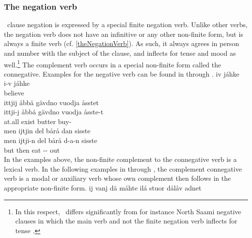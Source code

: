 \subsubsection{The negation verb}\label{negation}
\PS\ clause negation is expressed by a special finite negation verb. Unlike other verbs, the negation verb does not have an infinitive or any other non-finite form, but is always a finite verb (cf. \SEC\ref{theNegationVerb}). As such, it always agrees in person and number with the subject of the clause, and inflects for tense and mood as well.\footnote{In this respect, \PS\ differs significantly from for instance North Saami negative clauses in which the main verb and not the finite negation verb inflects for tense \citep[cf.][92]{Svonni2009}.} 
The complement verb occurs in a special non-finite form called the connegative.
Examples for the negative verb can be found in  through . 
\ea\label{negation1}%
\glll	iv jáhke\\
	i-v jáhke\\
	 believe\BS{} \\\nopagebreak
{} 
\z
\ea\label{negation2}%
\glll	ittjij åbbå gävdno vuodja åsstet\\
	ittji-j åbbå gävdno vuodja åsste-t\\
	 at.all exist\BS{} butter\BS{} buy-\\\nopagebreak
{} 
\z
\ea\label{negation3}%
\glll	men ijtjin del bårå dan sisste \\
	men ijtji-n del bårå d-a-n sisste \\
	but  then eat\BS{} -- out\\\nopagebreak
{} 
\z
In the examples above, the non-finite complement to the connegative verb is a lexical verb. In the following examples in  through , the complement connegative verb is a modal or auxiliary verb whose own complement then follows in the appropriate non-finite form.
\ea\label{negation4}%
\glll	ij vanj dä máhte ilá stuor dålåv adnet\\
